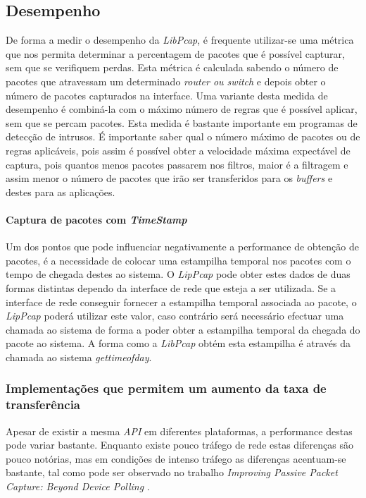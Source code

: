 \subsection{Desempenho}
De forma a medir o desempenho da \textit{LibPcap}, é frequente utilizar-se uma métrica que nos permita determinar a percentagem de pacotes que é possível capturar, sem que se verifiquem perdas.
Esta métrica é calculada sabendo o número de pacotes que atravessam um determinado \textit{router ou switch} e depois obter o número de pacotes capturados na interface.
Uma variante desta medida de desempenho é combiná-la com o máximo número de regras que é possível aplicar, sem que se percam pacotes.
Esta medida é bastante importante em programas de detecção de intrusos.
É importante saber qual o número máximo de pacotes ou de regras aplicáveis, pois assim é possível obter a velocidade máxima expectável de captura, pois quantos menos pacotes passarem nos filtros, maior é a filtragem e assim menor o número de pacotes que irão ser transferidos para os \textit{buffers} e destes para as aplicações.

\paragraph{Captura de pacotes com \textit{TimeStamp}}
Um dos pontos que pode influenciar negativamente a performance de obtenção de pacotes, é a necessidade de colocar uma estampilha temporal nos pacotes com o tempo de chegada destes ao sistema.
O \textit{LipPcap} pode obter estes dados de duas formas distintas dependo da interface de rede que esteja a ser utilizada.
Se a interface de rede conseguir fornecer a estampilha temporal associada ao pacote, o \textit{LipPcap} poderá utilizar este valor, caso contrário será necessário efectuar uma chamada ao sistema de forma a poder obter a estampilha temporal da chegada do pacote ao sistema.
A forma como a \textit{LibPcap} obtém esta estampilha é através da chamada ao sistema \textit{gettimeofday}.

\subsubsection{Implementações que permitem um aumento da taxa de transferência}

Apesar de existir a mesma \textit{API} em diferentes plataformas, a performance destas pode variar bastante.
Enquanto existe pouco tráfego de rede estas diferenças são pouco notórias, mas em condições de intenso tráfego as diferenças acentuam-se bastante, tal como pode ser observado no trabalho \textit{Improving Passive Packet Capture: Beyond Device Polling} \cite{Deri2004}.

